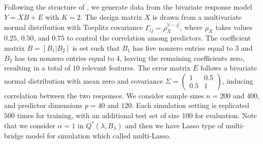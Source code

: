 \documentclass[twoside]{article}
\begin{document}
Following the structure of \cite{ghatari2024}, we generate data from the bivariate response model $Y = XB + E$ with $K=2$. The design matrix $X$ is drawn from a multivariate normal distribution with Toeplitz covariance $\Gamma_{ij} = \rho_X^{|i-j|}$, where $\rho_X$ takes values $0.25$, $0.50$, and $0.75$ to control the correlation among predictors. The coefficient matrix $B = [B_1|B_2]$ is set such that $B_1$ has five nonzero entries equal to $3$ and $B_2$ has ten nonzero entries equal to $4$, leaving the remaining coefficients zero, resulting in a total of $10$ relevant features. The error matrix $E$ follows a bivariate normal distribution with mean zero and covariance $\Sigma = \begin{pmatrix}1&0.5\\0.5&1\end{pmatrix}$, inducing correlation between the two responses. We consider sample sizes $n = 200$ and $400$, and predictor dimensions $p = 40$ and $120$. Each simulation setting is replicated $500$ times for training, with an additional test set of size $100$ for evaluation. Note that we consider $\alpha=1$ in  $Q^*(\lambda, B_\lambda)$ and then we have Lasso type of multi-bridge model for simulation which called multi-Lasso.
\end{document}
